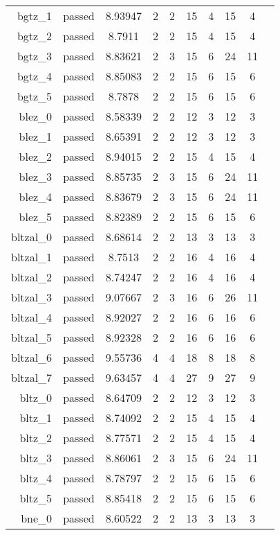 \begin{longtable}{r|ccccccccc}
    bgtz\_1 & passed & 8.93947 & 2 & 2 & 15 & 4 & 15 & 4 \\
    bgtz\_2 & passed & 8.7911 & 2 & 2 & 15 & 4 & 15 & 4 \\
    bgtz\_3 & passed & 8.83621 & 2 & 3 & 15 & 6 & 24 & 11 \\
    bgtz\_4 & passed & 8.85083 & 2 & 2 & 15 & 6 & 15 & 6 \\
    bgtz\_5 & passed & 8.7878 & 2 & 2 & 15 & 6 & 15 & 6 \\
    blez\_0 & passed & 8.58339 & 2 & 2 & 12 & 3 & 12 & 3 \\
    blez\_1 & passed & 8.65391 & 2 & 2 & 12 & 3 & 12 & 3 \\
    blez\_2 & passed & 8.94015 & 2 & 2 & 15 & 4 & 15 & 4 \\
    blez\_3 & passed & 8.85735 & 2 & 3 & 15 & 6 & 24 & 11 \\
    blez\_4 & passed & 8.83679 & 2 & 3 & 15 & 6 & 24 & 11 \\
    blez\_5 & passed & 8.82389 & 2 & 2 & 15 & 6 & 15 & 6 \\
    bltzal\_0 & passed & 8.68614 & 2 & 2 & 13 & 3 & 13 & 3 \\
    bltzal\_1 & passed & 8.7513 & 2 & 2 & 16 & 4 & 16 & 4 \\
    bltzal\_2 & passed & 8.74247 & 2 & 2 & 16 & 4 & 16 & 4 \\
    bltzal\_3 & passed & 9.07667 & 2 & 3 & 16 & 6 & 26 & 11 \\
    bltzal\_4 & passed & 8.92027 & 2 & 2 & 16 & 6 & 16 & 6 \\
    bltzal\_5 & passed & 8.92328 & 2 & 2 & 16 & 6 & 16 & 6 \\
    bltzal\_6 & passed & 9.55736 & 4 & 4 & 18 & 8 & 18 & 8 \\
    bltzal\_7 & passed & 9.63457 & 4 & 4 & 27 & 9 & 27 & 9 \\
    bltz\_0 & passed & 8.64709 & 2 & 2 & 12 & 3 & 12 & 3 \\
    bltz\_1 & passed & 8.74092 & 2 & 2 & 15 & 4 & 15 & 4 \\
    bltz\_2 & passed & 8.77571 & 2 & 2 & 15 & 4 & 15 & 4 \\
    bltz\_3 & passed & 8.86061 & 2 & 3 & 15 & 6 & 24 & 11 \\
    bltz\_4 & passed & 8.78797 & 2 & 2 & 15 & 6 & 15 & 6 \\
    bltz\_5 & passed & 8.85418 & 2 & 2 & 15 & 6 & 15 & 6 \\
    bne\_0 & passed & 8.60522 & 2 & 2 & 13 & 3 & 13 & 3 \\

\end{longtable}
